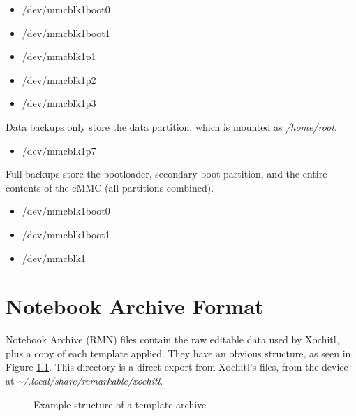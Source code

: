 \documentclass{memoir}
\begin{document}
{\begin{itemize}
\item{/dev/mmcblk1boot0}
\item{/dev/mmcblk1boot1}
\item{/dev/mmcblk1p1}
\item{/dev/mmcblk1p2}
\item{/dev/mmcblk1p3}
\end{itemize}

Data backups only store the data partition, which is mounted as \textit{/home/root}.

\begin{itemize}
\item{/dev/mmcblk1p7}
\end{itemize}

Full backups store the bootloader, secondary boot partition, and the entire contents of the eMMC (all partitions combined).

\begin{itemize}
\item{/dev/mmcblk1boot0}
\item{/dev/mmcblk1boot1}
\item{/dev/mmcblk1}
\end{itemize}


\chapter{Notebook Archive Format}
\label{sec:notebookarchiveformat}
Notebook Archive (RMN) files contain the raw editable data used by Xochitl, plus a copy of each template applied. They have an obvious structure, as seen in Figure \ref{fig:rmnstructure}. This directory is a direct export from Xochitl's files, from the device at \textit{\textasciitilde/.local/share/remarkable/xochitl}.

\begin{figure}[h]
\caption{Example structure of a template archive}
\label{fig:rmnstructure}
\end{figure}

}
\end{document}
